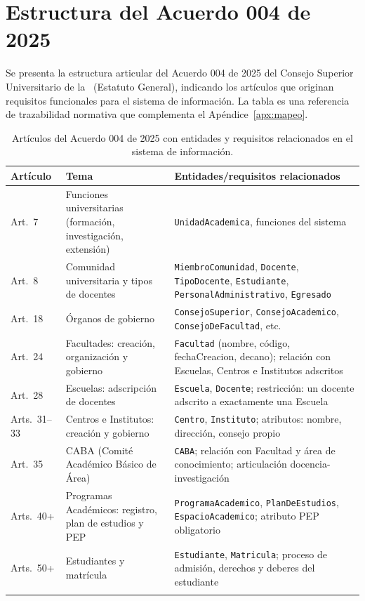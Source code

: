\chapter{Estructura del Acuerdo 004 de 2025}
\label{apx:acuerdo}

\noindent
Se presenta la estructura articular del Acuerdo 004 de 2025 del Consejo
Superior Universitario de la \ud\ (Estatuto General), indicando los
artículos que originan requisitos funcionales para el sistema de
información. La tabla es una referencia de trazabilidad normativa que
complementa el Apéndice~\ref{apx:mapeo}.

\begin{longtable}{C{1.5cm} L{5cm} L{6cm}}
  \toprule
  \textbf{Artículo} & \textbf{Tema} & \textbf{Entidades/requisitos relacionados} \\
  \midrule
  \endhead
  Art.~7  & Funciones universitarias (formación, investigación, extensión)
             & \texttt{UnidadAcademica}, funciones del sistema \\
  \midrule
  Art.~8  & Comunidad universitaria y tipos de docentes
             & \texttt{MiembroComunidad}, \texttt{Docente},
               \texttt{TipoDocente}, \texttt{Estudiante},
               \texttt{PersonalAdministrativo}, \texttt{Egresado} \\
  \midrule
  Art.~18 & Órganos de gobierno
             & \texttt{ConsejoSuperior}, \texttt{ConsejoAcademico},
               \texttt{ConsejoDeFacultad}, etc. \\
  \midrule
  Art.~24 & Facultades: creación, organización y gobierno
             & \texttt{Facultad} (nombre, código, fechaCreacion, decano);
               relación con Escuelas, Centros e Institutos adscritos \\
  \midrule
  Art.~28 & Escuelas: adscripción de docentes
             & \texttt{Escuela}, \texttt{Docente};
               restricción: un docente adscrito a exactamente una Escuela \\
  \midrule
  Arts.~31--33 & Centros e Institutos: creación y gobierno
             & \texttt{Centro}, \texttt{Instituto};
               atributos: nombre, dirección, consejo propio \\
  \midrule
  Art.~35 & CABA (Comité Académico Básico de Área)
             & \texttt{CABA}; relación con Facultad y área de conocimiento;
               articulación docencia-investigación \\
  \midrule
  Arts.~40+ & Programas Académicos: registro, plan de estudios y PEP
             & \texttt{ProgramaAcademico}, \texttt{PlanDeEstudios},
               \texttt{EspacioAcademico}; atributo PEP obligatorio \\
  \midrule
  Arts.~50+ & Estudiantes y matrícula
             & \texttt{Estudiante}, \texttt{Matricula};
               proceso de admisión, derechos y deberes del estudiante \\
  \bottomrule
  \caption{Artículos del Acuerdo 004 de 2025 con entidades y requisitos
    relacionados en el sistema de información.}
  \label{tab:acuerdo-estructura}
\end{longtable}

